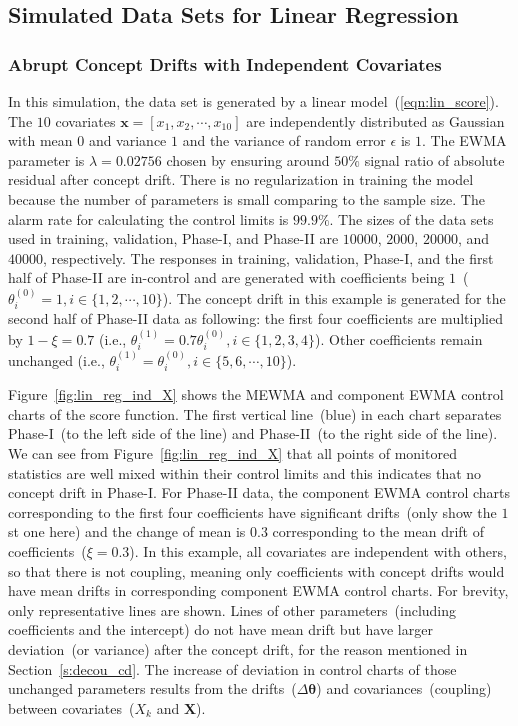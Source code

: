 \documentclass[twoside,11pt]{article}
\begin{document}
\begin{appendices}
\subsection{Simulated Data Sets for Linear Regression}
\label{sss:lin_exp}

\subsubsection{Abrupt Concept Drifts with Independent Covariates}
\label{ssss:lin_ind_pred}
In this simulation, the data set is generated by a {linear} model~(\ref{eqn:lin_score}). The $10$ {covariates} {$\bm {x}=[x_1, x_2, \cdots, x _{10}]$} are independently distributed as Gaussian with mean $0$ and variance $1$ and the variance of random error $ \epsilon$ is $1$. The EWMA parameter is $\lambda=0.02756$ chosen by ensuring around $50\%$ signal ratio of absolute residual after concept drift. There is no regularization in training the model because the number of parameters is small comparing to the sample size. The alarm rate for calculating the control limits is $99.9\%$. The sizes of the data sets used in training, validation, Phase-I, and Phase-II are $10000$, $2000$, $20000$, and $40000$, respectively. The responses in training, validation, Phase-I, and the first half of Phase-II are in-control and are generated with coefficients being $1$~($\theta_i^{(0)}=1, i\in\{1,2,\cdots,10\}$). The concept drift in this example is generated for the second half of Phase-II data as following: the first four coefficients are multiplied by $1-\xi=0.7$ (i.e., $\theta_i^{(1)}=0.7\theta_i^{(0)}, i\in\{1,2,3,4\}$). Other coefficients remain unchanged (i.e., $\theta_i^{(1)}=\theta_i^{(0)}, i\in\{5,6,\cdots,10\}$).

Figure~\ref{fig:lin_reg_ind_X} shows the MEWMA and component EWMA control charts of the score function. The first vertical line~(blue) in each chart separates Phase-I~(to the left side of the line) and Phase-II~(to the right side of the line). We can see from Figure~\ref{fig:lin_reg_ind_X} that all points of monitored statistics are well mixed within their control limits and this indicates that no concept drift in Phase-I. For Phase-II data, the component EWMA control charts corresponding to the first four coefficients have significant drifts~(only show the $1$st one here) and the change of mean is $0.3$ corresponding to the mean drift of coefficients~($\xi=0.3$). In this example, all covariates are independent with others, so that there is not coupling, meaning only coefficients with concept drifts would have mean drifts in corresponding component EWMA control charts. For brevity, only representative lines are shown. Lines of other parameters~(including coefficients and the intercept) do not have mean drift but have larger deviation~(or variance) after the concept drift, for the reason mentioned in Section~\ref{s:decou_cd}. The increase of deviation in control charts of those unchanged parameters results from the drifts~($\Delta \bm { \theta}$) and covariances~(coupling) between covariates~($X_k$ and $\bm {X}$).


\end{appendices}
\end{document}
